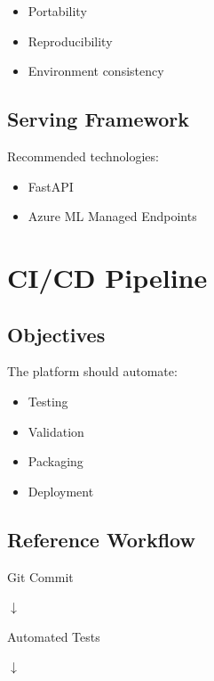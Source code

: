 \begin{itemize}
    \item Portability
    \item Reproducibility
    \item Environment consistency
\end{itemize}

\subsection{Serving Framework}

Recommended technologies:

\begin{itemize}
    \item FastAPI
    \item Azure ML Managed Endpoints
\end{itemize}

\section{CI/CD Pipeline}

\subsection{Objectives}

The platform should automate:

\begin{itemize}
    \item Testing
    \item Validation
    \item Packaging
    \item Deployment
\end{itemize}

\subsection{Reference Workflow}

\begin{center}
Git Commit
\end{center}

\begin{center}
$\downarrow$
\end{center}

\begin{center}
Automated Tests
\end{center}

\begin{center}
$\downarrow$
\end{center}

